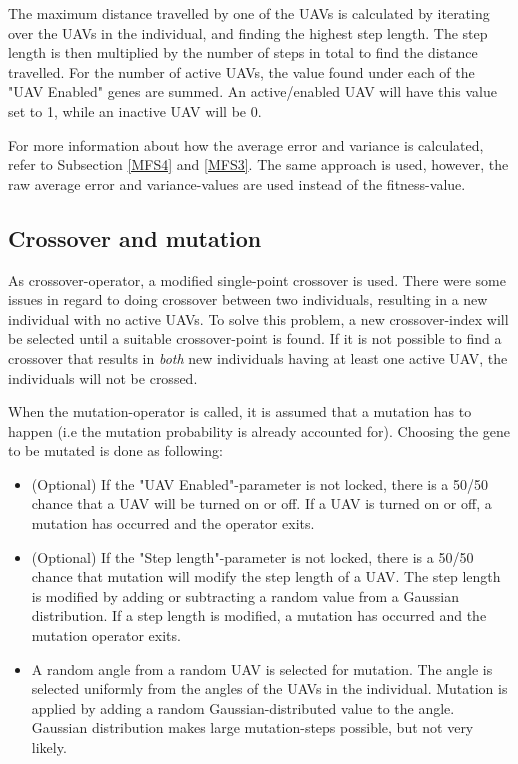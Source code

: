 \documentclass[10pt,a4paper]{book}
\begin{document}
The maximum distance travelled by one of the \glspl{UAV} is calculated by iterating over the \glspl{UAV} in the individual, and finding the highest step length. The step length is then multiplied by the number of steps in total to find the distance travelled. For the number of active \glspl{UAV}, the value found under each of the "\gls{UAV} Enabled" genes are summed. An active/enabled \gls{UAV} will have this value set to 1, while an inactive \gls{UAV} will be 0.

For more information about how the average error and variance is calculated, refer to Subsection \ref{MFS4} and \ref{MFS3}. The same approach is used, however, the raw average error and variance-values are used instead of the fitness-value.



\newpage
\subsection{Crossover and mutation}

As crossover-operator, a modified single-point crossover is used. There were some issues in regard to doing crossover between two individuals, resulting in a new individual with no active \glspl{UAV}. To solve this problem, a new crossover-index will be selected until a suitable crossover-point is found. If it is not possible to find a crossover that results in \textit{both} new individuals having at least one active \gls{UAV}, the individuals will not be crossed. 

When the mutation-operator is called, it is assumed that a mutation has to happen (i.e the mutation probability is already accounted for). Choosing the gene to be mutated is done as following:

\begin{itemize}
\item (Optional) If the "UAV Enabled"-parameter is not locked, there is a 50/50 chance that a \gls{UAV} will be turned on or off. If a \gls{UAV} is turned on or off, a mutation has occurred and the operator exits.
\item (Optional) If the "Step length"-parameter is not locked, there is a 50/50 chance that mutation will modify the step length of a \gls{UAV}. The step length is modified by adding or subtracting a random value from a Gaussian distribution. If a step length is modified, a mutation has occurred and the mutation operator exits.
\item A random angle from a random \gls{UAV} is selected for mutation. The angle is selected uniformly from the angles of the \glspl{UAV} in the individual. Mutation is applied by adding a random Gaussian-distributed value to the angle. Gaussian distribution makes large mutation-steps possible, but not very likely.  
\end{itemize}
\end{document}
